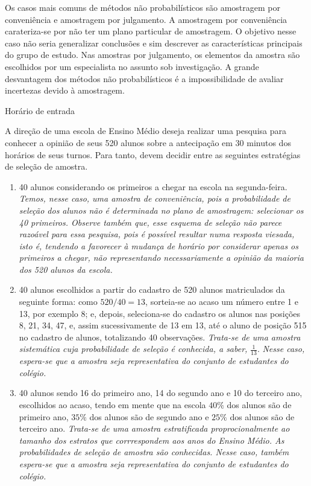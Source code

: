 {\begin{enumerate}
\end{enumerate}

Os casos mais comuns de métodos não probabilísticos são amostragem por conveniência e amostragem por julgamento. A amostragem por conveniência carateriza-se por não ter um plano particular de amostragem. O objetivo nesse caso não seria generalizar conclusões e sim descrever as características principais do grupo de estudo.  Nas amostras por julgamento, os elementos da amostra são escolhidos por um especialista no assunto sob investigação. A grande desvantagem dos métodos não probabilísticos é a impossibilidade de avaliar incertezas devido à amostragem.

\begin{example}{Horário de entrada}

A direção de uma escola de Ensino Médio deseja realizar uma pesquisa para conhecer a opinião de seus 520 alunos sobre a antecipação em 30 minutos dos horários de seus turnos. Para tanto, devem decidir entre as seguintes estratégias de seleção de amostra.
\begin{enumerate}
\item {} 
40 alunos considerando os primeiros a chegar na  escola na segunda-feira.  \emph{Temos, nesse caso, uma amostra de conveniência, pois a probabilidade de seleção dos alunos não é determinada no plano de amostragem: selecionar os 40 primeiros. Observe também que, esse esquema de seleção não parece razoável para essa pesquisa, pois é possível resultar numa resposta viesada, isto é, tendendo a favorecer à mudança de horário por considerar apenas os primeiros a chegar, não representando necessariamente a opinião da maioria dos 520 alunos da escola.}

\item {} 
40 alunos escolhidos a partir do cadastro de 520 alunos matriculados da seguinte forma: como \(520/40=13\), sorteia-se ao acaso um número entre 1 e 13, por exemplo 8; e, depois, seleciona-se do cadastro os alunos nas posições 8, 21, 34, 47,  e, assim sucessivamente de 13 em 13, até o aluno de posição 515 no cadastro de alunos, totalizando 40 observações. \emph{Trata-se de uma amostra sistemática cuja probabilidade de seleção é conhecida, a saber,} \(\frac{1}{13}\). \emph{Nesse caso, espera-se que a amostra seja representativa do conjunto de estudantes do colégio.}

\item {} 
40 alunos sendo 16 do primeiro ano, 14 do segundo ano e 10 do terceiro ano, escolhidos ao acaso, tendo em mente que na escola $40\%$ dos alunos são de primeiro ano, $35\%$ dos alunos são de segundo ano e $25\%$ dos alunos são de terceiro ano. \emph{Trata-se de uma amostra estratificada proprocionalmente ao tamanho dos estratos que corrrespondem aos anos do Ensino Médio. As probabilidades de seleção de amostra são conhecidas.  Nesse caso, também espera-se que a amostra seja representativa do conjunto de estudantes do colégio.}


\end{enumerate}
\end{example}}

